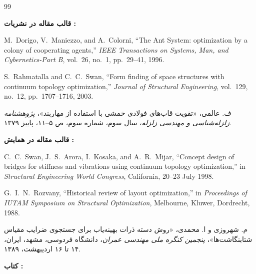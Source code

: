 
\begin{thebibliography}{99}
\small

\item[] \noindent\textbf{قالب مقاله در نشریات :}

\begin{LTRbibitems}
\resetlatinfont
{}
M.~Dorigo, V.~Maniezzo, and A.~Colorni, ``The Ant System: optimization by a colony of cooperating agents,'' \emph{IEEE Transactions on Systems, Man, and Cybernetics-Part B}, vol.~26, no.~1, pp.~29--41, 1996.

S.~Rahmatalla and C.~C.~Swan, ``Form finding of space structures with continuum topology optimization,'' \emph{Journal of Structural Engineering}, vol.~129, no.~12, pp.~1707--1716, 2003.
\end{LTRbibitems}

ف. عالمی، «تقویت قاب‌های فولادی خمشی با استفاده از مهاربند»، \emph{پژوهشنامه زلزله‌شناسی و مهندسی زلزله}، سال سوم، شماره سوم، ص ۵--۱۱، پاییز ۱۳۷۹.


\item[] \noindent\textbf{قالب مقاله در همایش :}

\begin{LTRbibitems}
\resetlatinfont
{}
C.~C.~Swan, J.~S.~Arora, I.~Kosaka, and A.~R.~Mijar, ``Concept design of bridges for stiffness and vibrations using continuum topology optimization,'' in \emph{Structural Engineering World Congress}, California, 20--23 July 1998.

G.~I.~N.~Rozvany, ``Historical review of layout optimization,'' in \emph{Proceedings of IUTAM Symposium on Structural Optimization}, Melbourne, Kluwer, Dordrecht, 1988.
\end{LTRbibitems}

م. شهروزی و ا. محمدی، «روش دسته ذرات بهینه‌یاب برای جستجوی ضرایب مقیاس شتابنگاشت‌ها»، \emph{پنجمین کنگره ملی مهندسی عمران}، دانشگاه فردوسی، مشهد، ایران، ۱۴ تا ۱۶ اردیبهشت، ۱۳۸۹.


\item[] \noindent\textbf{کتاب :}


\end{thebibliography}
